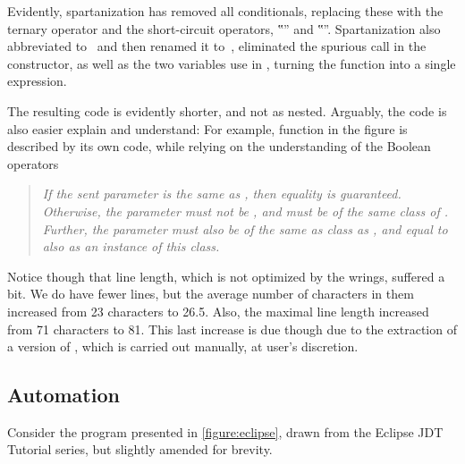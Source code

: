 Evidently, spartanization has removed all conditionals, replacing these with
the ternary operator and the short-circuit operators, ‟\cc{\textbar\textbar}”
and ‟”. Spartanization also abbreviated  to~ and then
renamed it to~, eliminated the spurious  call in the
constructor, as well as the two variables use in , turning the
function into a single expression.

The resulting code is evidently shorter, and not as nested. Arguably, the code
is also easier explain and understand: For example, function  in the figure is described by its own code, while relying on the
understanding of the Boolean operators

\vspace{-2ex}
\begin{quote}\itshape\scriptsize
  If the sent parameter is the same as , then equality is guaranteed.
  Otherwise, the parameter must not be , and must be of the same class
  of . Further, the parameter must also be of the same as class as
  , and equal to  also as an instance of this class.
\end{quote}
\vspace{-2ex}

Notice though that line length, which is not optimized by the wrings, suffered
a bit. We do have fewer lines, but the average number of characters in them
increased from 23 characters to 26.5. Also, the maximal line length increased
from 71 characters to 81. This last increase is due though due to the
extraction of a  version of , which is carried
out manually, at user's discretion.

\subsection{Automation}
\label{section:automation}
Consider the \Java program presented in \cref{figure:eclipse}, drawn from the
Eclipse JDT Tutorial series,
but slightly amended for brevity.

